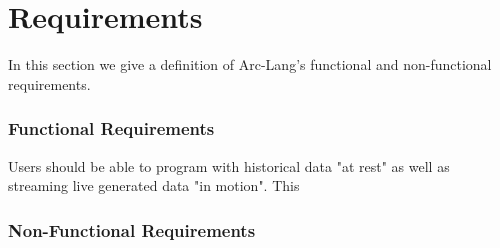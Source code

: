\section{Requirements}

In this section we give a definition of Arc-Lang's functional and non-functional requirements. 

\subsubsection{Functional Requirements}

Users should be able to program with historical data "at rest" as well as streaming live generated data "in motion". This 

\subsubsection{Non-Functional Requirements}

